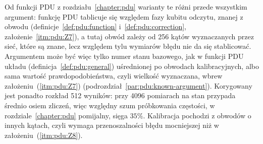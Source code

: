 Od funkcji PDU z rozdziału~\ref{chapter:pdu} warianty te różni przede wszystkim argument: funkcję PDU tablicuje się względem fazy kubitu odczytu, znanej z obwodu (definicje~\ref{def:pdu:function} i~\ref{def:pdu:correction}, założenie~\ref{itm:pdu:Z7}), a tutaj obwód zależy od 256 kątów wyznaczanych przez sieć, które są znane, lecz względem tylu wymiarów błędu nie da się stablicować.
Argumentem może być więc tylko numer stanu bazowego, jak w funkcji PDU układu (definicja~\ref{def:pdu:general}) uśrednionej po obwodach kalibracyjnych, albo sama wartość prawdopodobieństwa, czyli wielkość wyznaczana, wbrew założeniu~(\ref{itm:pdu:Z7}) (podrozdział~\ref{par:pdu:known-argument}).
Korygowany jest ponadto rozkład 512 wyników: przy 4096 pomiarach na stan przypada średnio osiem zliczeń, więc względny szum próbkowania częstości, w rozdziale~\ref{chapter:pdu} pomijalny, sięga $35\%$.
Kalibracja pochodzi z obwodów o innych kątach, czyli wymaga przenoszalności błędu mocniejszej niż w założeniu~(\ref{itm:pdu:Z8}).

